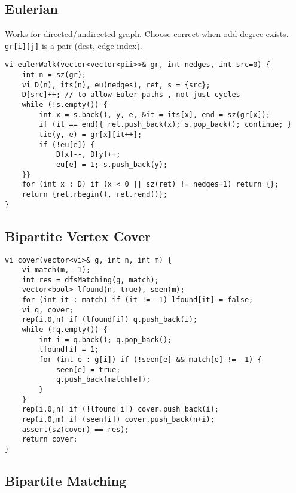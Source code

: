 \documentclass[a4paper,9pt]{article}
\begin{document}
\subsection{Eulerian}

Works for directed/undirected graph. Choose correct when odd degree exists. \verb|gr[i][j]| is a pair (dest, edge index).
\begin{lstlisting}
vi eulerWalk(vector<vector<pii>>& gr, int nedges, int src=0) {
	int n = sz(gr);
	vi D(n), its(n), eu(nedges), ret, s = {src};
	D[src]++; // to allow Euler paths , not just cycles
	while (!s.empty()) {
		int x = s.back(), y, e, &it = its[x], end = sz(gr[x]);
		if (it == end){ ret.push_back(x); s.pop_back(); continue; }
		tie(y, e) = gr[x][it++];
		if (!eu[e]) {
			D[x]--, D[y]++;
			eu[e] = 1; s.push_back(y);
	}}
	for (int x : D) if (x < 0 || sz(ret) != nedges+1) return {};
	return {ret.rbegin(), ret.rend()};
}
\end{lstlisting}

\subsection{Bipartite Vertex Cover}

\begin{lstlisting}
vi cover(vector<vi>& g, int n, int m) {
	vi match(m, -1);
	int res = dfsMatching(g, match);
	vector<bool> lfound(n, true), seen(m);
	for (int it : match) if (it != -1) lfound[it] = false;
	vi q, cover;
	rep(i,0,n) if (lfound[i]) q.push_back(i);
	while (!q.empty()) {
		int i = q.back(); q.pop_back();
		lfound[i] = 1;
		for (int e : g[i]) if (!seen[e] && match[e] != -1) {
			seen[e] = true;
			q.push_back(match[e]);
		}
	}
	rep(i,0,n) if (!lfound[i]) cover.push_back(i);
	rep(i,0,m) if (seen[i]) cover.push_back(n+i);
	assert(sz(cover) == res);
	return cover;
}
\end{lstlisting}

\subsection{Bipartite Matching}
\end{document}
